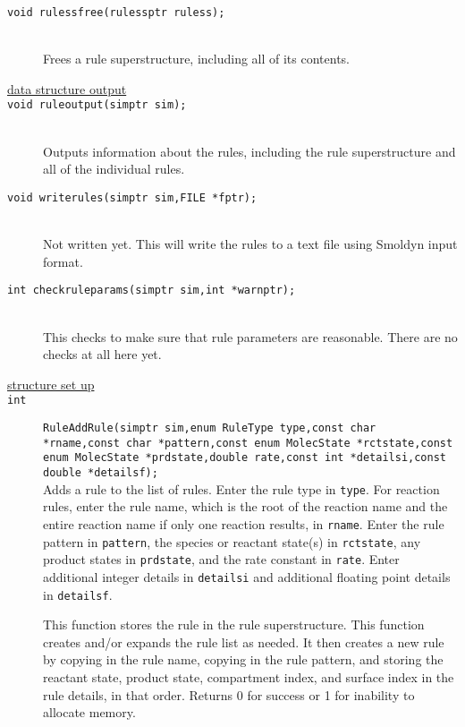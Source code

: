 \documentclass {book}
\begin{document}
\begin{description}
\item[\texttt{void rulessfree(rulessptr ruless);}]
\hfill \\
Frees a rule superstructure, including all of its contents.

\item[\underline{data structure output}]

\item[\texttt{void ruleoutput(simptr sim);}]
\hfill \\
Outputs information about the rules, including the rule superstructure and all of the individual rules.

\item[\texttt{void writerules(simptr sim,FILE *fptr);}]
\hfill \\
Not written yet.  This will write the rules to a text file using Smoldyn input format.

\item[\texttt{int checkruleparams(simptr sim,int *warnptr);}]
\hfill \\
This checks to make sure that rule parameters are reasonable.  There are no checks at all here yet.

\item[\underline{structure set up}]

\item[\texttt{int}]
\texttt{RuleAddRule(simptr sim,enum RuleType type,const char *rname,const char *pattern,const enum MolecState *rctstate,const enum MolecState *prdstate,double rate,const int *detailsi,const double *detailsf);}
\hfill \\
Adds a rule to the list of rules.  Enter the rule type in \texttt{type}.  For reaction rules, enter the rule name, which is the root of the reaction name and the entire reaction name if only one reaction results, in \texttt{rname}.  Enter the rule pattern in \texttt{pattern}, the species or reactant state(s) in \texttt{rctstate}, any product states in \texttt{prdstate}, and the rate constant in \texttt{rate}.  Enter additional integer details in \texttt{detailsi} and additional floating point details in \texttt{detailsf}.

This function stores the rule in the rule superstructure.  This function creates and/or expands the rule list as needed.  It then creates a new rule by copying in the rule name, copying in the rule pattern, and storing the reactant state, product state, compartment index, and surface index in the rule details, in that order.  Returns 0 for success or 1 for inability to allocate memory.


\end{description}
\end{document}
